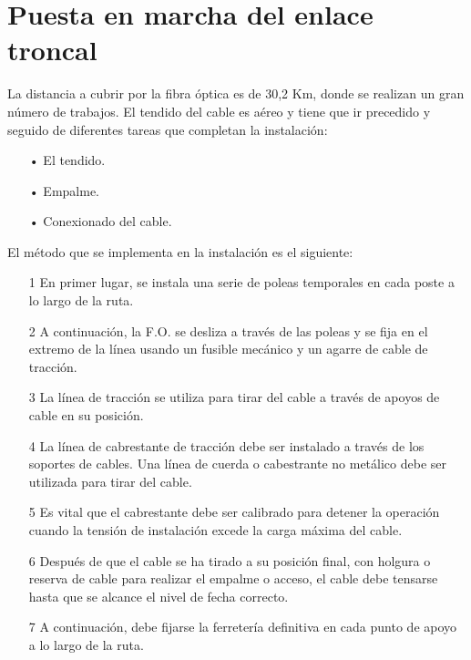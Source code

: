 \section{Puesta en marcha del enlace troncal}
La distancia a cubrir por la fibra óptica es de 30,2 Km, donde se realizan un gran número de trabajos. El tendido del cable es aéreo y tiene que ir precedido y seguido de diferentes tareas que completan la instalación:
\begin{itemize}

\item[•]El tendido.
\item[•]Empalme.
\item[•]Conexionado del cable.



\end{itemize}
El método que se implementa en la instalación es el siguiente:
\begin{enumerate}


\item[1]En primer lugar, se instala una serie de poleas temporales en cada poste a lo largo de la ruta.


\item[2]A continuación, la F.O. se desliza a través de las poleas y se fija en el extremo de la línea usando un fusible mecánico y un agarre de cable de tracción.





\item[3]La línea de tracción se utiliza para tirar del cable a través de apoyos de cable en su posición.

\item[4]La línea de cabrestante de tracción debe ser instalado a través de los soportes de cables. Una línea de cuerda o cabestrante no metálico debe ser utilizada para tirar del cable.

\item[5]Es vital que el cabrestante debe ser calibrado para detener la operación cuando la tensión de instalación excede la carga máxima del cable.

\item[6]Después de que el cable se ha tirado a su posición final, con holgura o reserva de cable para realizar el empalme o acceso, el cable debe tensarse hasta que se alcance el nivel de fecha correcto.

\item[7]A continuación, debe fijarse la ferretería definitiva en cada punto de apoyo a lo largo de la ruta.




\end{enumerate}

